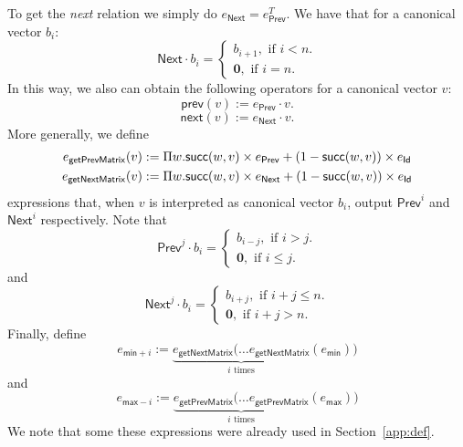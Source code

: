 To get the \textit{next} relation we simply do $e_{\mathsf{Next}} = e_{\mathsf{Prev}}^T$. We have that for a canonical vector $b_i$:
\[
{\mathsf{Next}}\cdot b_i=\begin{cases}
               b_{i+1}, \text{ if } i < n. \\
              \mathbf{0}, \text{ if } i = n.
            \end{cases}
\]
In this way, we also can obtain the following operators for a canonical vector $v$: 
$$\mathsf{prev}(v):=e_{\mathsf{Prev}}\cdot v.$$
$$\mathsf{next}(v):=e_{\mathsf{Next}}\cdot v.$$
More generally, we define 
\begin{align*}
    e_{\mathsf{getPrevMatrix}}(v)&:=\Pi w.  \mathsf{succ}(w,v)\times e_{\mathsf{Prev}} + (1 - \mathsf{succ}(w,v))\times e_{\mathsf{Id}}\\
    e_{\mathsf{getNextMatrix}}(v)&:=\Pi w. \mathsf{succ}(w,v)\times e_{\mathsf{Next}} + (1 - \mathsf{succ}(w,v))\times e_{\mathsf{Id}}
\end{align*}
expressions that, when $v$ is interpreted as canonical vector $b_i$, output $\mathsf{Prev}^i$ and $\mathsf{Next}^i$ respectively.
Note that
\[
\mathsf{Prev}^j\cdot b_i=\begin{cases}
               b_{i-j}, \text{ if } i > j. \\
              \mathbf{0}, \text{ if } i \leq j.
            \end{cases}
\]
and
\[
\mathsf{Next}^j\cdot b_i=\begin{cases}
               b_{i+j}, \text{ if } i + j \leq n. \\
              \mathbf{0}, \text{ if } i + j > n.
            \end{cases}
\]
Finally, define
$$
e_{\mathsf{min}+i}:=\underbrace{e_{\mathsf{getNextMatrix}}(\ldots e_{\mathsf{getNextMatrix}}}_{i \text{ times}}(e_{\mathsf{min}}))
$$
and
$$
e_{\mathsf{max}-i}:=\underbrace{e_{\mathsf{getPrevMatrix}}(\ldots e_{\mathsf{getPrevMatrix}}}_{i \text{ times}}(e_{\mathsf{max}}))
$$
We note that some these expressions were already used in Section~\ref{app:def}.